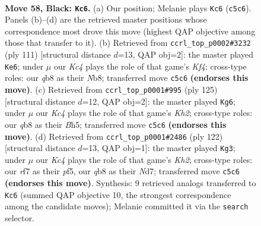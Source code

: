\documentclass[11pt]{article}
\begin{document}
\clearpage

\begin{figure}[p]\centering
\begin{subfigure}{0.46\textwidth}\centering
\resizebox{\linewidth}{!}{%
\newchessgame
\chessboard[
  setfen={1Q6/5R2/8/2k5/8/1B2K3/8/8 b - - 0 58},
  showmover=false,
  pgfstyle=straightmove, color=movearrow, markmove={c5-c6}
]}
\caption{}
\end{subfigure}\hfill
\begin{subfigure}{0.46\textwidth}\centering
\resizebox{\linewidth}{!}{%
\newchessgame
\chessboard[
  setfen={1n6/8/8/R4k2/3K4/8/6b1/4B3 b - - 2 56},
  showmover=false,
  pgfstyle=straightmove, color=movearrow, markmove={f5-e6}
]}
\caption{}
\end{subfigure}
\\[4pt]
\begin{subfigure}{0.46\textwidth}\centering
\resizebox{\linewidth}{!}{%
\newchessgame
\chessboard[
  setfen={8/7k/5B2/7b/5r2/2R5/7K/8 b - - 3 63},
  showmover=false,
  pgfstyle=straightmove, color=movearrow, markmove={h7-g6}
]}
\caption{}
\end{subfigure}\hfill
\begin{subfigure}{0.46\textwidth}\centering
\resizebox{\linewidth}{!}{%
\newchessgame
\chessboard[
  setfen={7k/3N4/8/5p2/4b3/8/7K/8 w - - 0 62},
  showmover=false,
  pgfstyle=straightmove, color=movearrow, markmove={h2-g3}
]}
\caption{}
\end{subfigure}
\caption{\textbf{Move 58, Black: \texttt{Kc6}.} (a) Our position; Melanie plays \texttt{Kc6} (\texttt{c5c6}). Panels (b)--(d) are the retrieved master positions whose correspondence most drove this move (highest QAP objective among those that transfer to it). (b) Retrieved from \texttt{ccrl\_top\_p0002\#3232} (ply 111) [structural distance $d$=13, QAP obj=2]: the master played \texttt{Ke6}; under $\mu$ our \emph{Kc4} plays the role of that game's \emph{Kf4}; cross-type roles: our \emph{q}b8 as their \emph{N}b8; transferred move \texttt{c5c6} \textbf{(endorses this move)}. (c) Retrieved from \texttt{ccrl\_top\_p0001\#995} (ply 125) [structural distance $d$=12, QAP obj=2]: the master played \texttt{Kg6}; under $\mu$ our \emph{Kc4} plays the role of that game's \emph{Kh2}; cross-type roles: our \emph{q}b8 as their \emph{B}h5; transferred move \texttt{c5c6} \textbf{(endorses this move)}. (d) Retrieved from \texttt{ccrl\_top\_p0001\#2486} (ply 122) [structural distance $d$=13, QAP obj=1]: the master played \texttt{Kg3}; under $\mu$ our \emph{Kc4} plays the role of that game's \emph{Kh2}; cross-type roles: our \emph{r}f7 as their \emph{p}f5, our \emph{q}b8 as their \emph{N}d7; transferred move \texttt{c5c6} \textbf{(endorses this move)}. Synthesis: 9 retrieved analogs transferred to \texttt{Kc6} (summed QAP objective 10, the strongest correspondence among the candidate moves); Melanie committed it via the \texttt{search} selector.}
\label{fig:thought-m115}
\end{figure}
\end{document}
